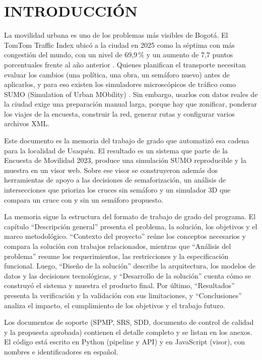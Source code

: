 \section{INTRODUCCIÓN}

La movilidad urbana es uno de los problemas más visibles de Bogotá. El TomTom Traffic Index ubicó a la ciudad en 2025 como la séptima con más congestión del mundo, con un nivel de 69,9\,\% y un aumento de 7,7 puntos porcentuales frente al año anterior \cite{eltiempo}. Quienes planifican el transporte necesitan evaluar los cambios (una política, una obra, un semáforo nuevo) antes de aplicarlos, y para eso existen los simuladores microscópicos de tráfico como SUMO (Simulation of Urban MObility) \cite{krajzewicz2012,lopez2018}. Sin embargo, usarlos con datos reales de la ciudad exige una preparación manual larga, porque hay que zonificar, ponderar los viajes de la encuesta, construir la red, generar rutas y configurar varios archivos XML.

Este documento es la memoria del trabajo de grado que automatizó esa cadena para la localidad de Usaquén. El resultado es un sistema que parte de la Encuesta de Movilidad 2023, produce una simulación SUMO reproducible y la muestra en un visor web. Sobre ese visor se construyeron además dos herramientas de apoyo a las decisiones de semaforización, un análisis de intersecciones que prioriza los cruces sin semáforo y un simulador 3D que compara un cruce con y sin un semáforo propuesto.

La memoria sigue la estructura del formato de trabajo de grado del programa. El capítulo “Descripción general” presenta el problema, la solución, los objetivos y el marco metodológico. “Contexto del proyecto” reúne los conceptos necesarios y compara la solución con trabajos relacionados, mientras que “Análisis del problema” resume los requerimientos, las restricciones y la especificación funcional. Luego, “Diseño de la solución” describe la arquitectura, los modelos de datos y las decisiones tecnológicas, y “Desarrollo de la solución” cuenta cómo se construyó el sistema y muestra el producto final. Por último, “Resultados” presenta la verificación y la validación con sus limitaciones, y “Conclusiones” analiza el impacto, el cumplimiento de los objetivos y el trabajo futuro.

Los documentos de soporte (SPMP, SRS, SDD, documento de control de calidad y la propuesta aprobada) contienen el detalle completo y se listan en los anexos. El código está escrito en Python (pipeline y API) y en JavaScript (visor), con nombres e identificadores en español.

